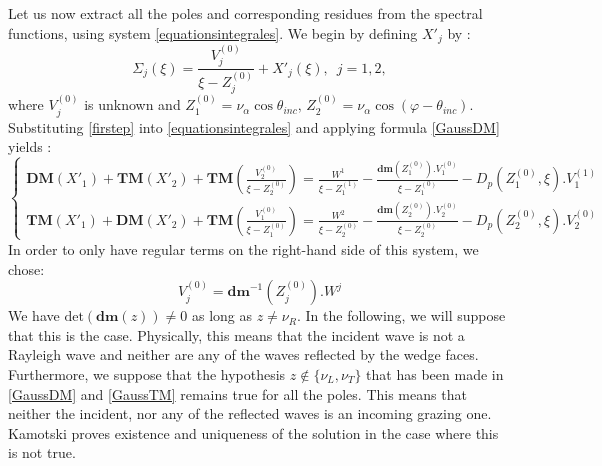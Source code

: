 Let us now extract all the poles and corresponding residues from the spectral functions, using system \eqref{equationsintegrales}. We begin by defining $X'_j$ by :
\begin{equation}
\Sigma_j(\xi)= \frac{V_j^{(0)}}{\xi-Z^{(0)}_j}+X'_j(\xi), \, \, \, j=1,2,
\label{firstep}
\end{equation}
where $V_j^{(0)}$ is unknown and $Z_1^{(0)}=\nu_{\alpha} \cos \theta_{inc}, \, Z_2^{(0)}=\nu_{\alpha} \cos(\varphi-\theta_{inc})$. Substituting \eqref{firstep} into \eqref{equationsintegrales} and applying formula \eqref{GaussDM} yields :
\begin{equation}
\left\{
\begin{matrix}
\textbf{DM}(X'_1)+\textbf{TM}(X'_2)+\textbf{TM}(\frac{V_2^{(0)}}{\xi-Z_2^{(0)}})=\frac{W^1}{\xi-Z_1^{(1)}}-\frac{\textbf{dm}(Z_1^{(0)}).V_1^{(0)}}{\xi-Z_1^{(0)}}-D_p(Z_1^{(0)},\xi).V_1^{(1)}\\
\textbf{TM}(X'_1)+\textbf{DM}(X'_2)+\textbf{TM}(\frac{V_1^{(0)}}{\xi-Z_1^{(0)}})=\frac{W^2}{\xi-Z_2^{(0)}}-\frac{\textbf{dm}(Z_2^{(0)}).V_2^{(0)}}{\xi-Z_2^{(0)}}-D_p(Z_2^{(0)},\xi).V_2^{(0)}
\end{matrix}
\right.
\end{equation}
In order to only have regular terms on the right-hand side of this system, we chose:
\begin{equation}
V_j^{(0)}=\textbf{dm}^{-1}(Z_j^{(0)}).W^j
\end{equation}
We have $\mbox{det}(\textbf{dm}(z) )\neq 0$ as long as $z\neq \nu_R$. In the following, we will suppose that this is the case. Physically, this means that the incident wave is not a Rayleigh wave and neither are any of the waves reflected by the wedge faces. Furthermore, we suppose that the hypothesis $z \notin \{ \nu_L, \nu_T\}$ that has been made in \eqref{GaussDM} and \eqref{GaussTM} remains true for all the poles. This means that neither the incident, nor any of the reflected waves is an incoming grazing one. Kamotski \cite{KamotskiCrit} proves existence and uniqueness of the solution in the case where this is not true.

